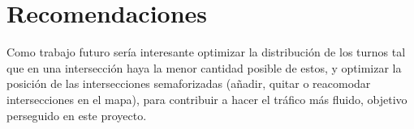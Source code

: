 \documentclass[colorinlistoftodos,twoside,twocolumn]{article} %
\begin{document}
	
	\section{Recomendaciones}
	
	
	
	Como trabajo futuro ser\'ia interesante optimizar la distribuci\'on de los turnos tal que en una intersecci\'on haya la menor cantidad posible de estos, y optimizar la posici\'on de las intersecciones semaforizadas (a\~nadir, quitar o reacomodar intersecciones en el mapa), para contribuir a hacer el tr\'afico m\'as fluido, objetivo perseguido en este proyecto.
	
	\listoftodos
\end{document}
